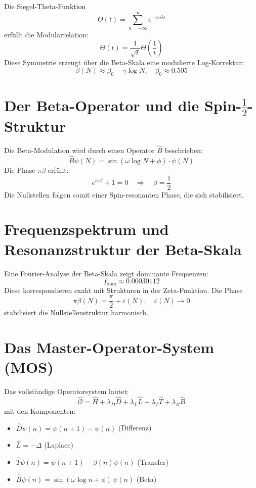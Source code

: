 \documentclass[11pt,a4paper]{article}
\begin{document}
Die Siegel-Theta-Funktion
\[
\Theta(t) = \sum_{n=-\infty}^{\infty} e^{-\pi n^2 t}
\]
erfüllt die Modularrelation:
\[
\Theta(t) = \frac{1}{\sqrt{t}} \Theta\left(\frac{1}{t}\right)
\]
Diese Symmetrie erzeugt über die Beta-Skala eine modulierte Log-Korrektur:
\[
\beta(N) \approx \beta_0 - \gamma \log N, \quad \beta_0 \approx 0.505
\]

\vspace{-1em}

\section{Der Beta-Operator und die Spin-\texorpdfstring{$\frac{1}{2}$}{1/2}-Struktur}

Die Beta-Modulation wird durch einen Operator $\hat{B}$ beschrieben:
\[
\hat{B} \psi(N) = \sin(\omega \log N + \phi) \cdot \psi(N)
\]
Die Phase $\pi \beta$ erfüllt:
\[
e^{i\pi \beta} + 1 = 0 \quad \Rightarrow \quad \beta = \frac{1}{2}
\]
Die Nullstellen folgen somit einer Spin-resonanten Phase, die sich stabilisiert.

\vspace{-1em}

\section{Frequenzspektrum und Resonanzstruktur der Beta-Skala}

Eine Fourier-Analyse der Beta-Skala zeigt dominante Frequenzen:
\[
f_{\text{dom}} \approx 0.00030112
\]
Diese korrespondieren exakt mit Strukturen in der Zeta-Funktion. Die Phase
\[
\pi \beta(N) = \frac{\pi}{2} + \varepsilon(N), \quad \varepsilon(N) \to 0
\]
stabilisiert die Nullstellenstruktur harmonisch.

\vspace{-1em}

\section{Das Master-Operator-System (MOS)}

Das vollständige Operatorsystem lautet:
\[
\hat{\mathcal{O}} = \hat{H} + \lambda_D \hat{D} + \lambda_L \hat{L} + \lambda_T \hat{T} + \lambda_B \hat{B}
\]
mit den Komponenten:

\begin{itemize}
    \item $\hat{D} \psi(n) = \psi(n+1) - \psi(n)$ (Differenz)
    \item $\hat{L} = -\Delta$ (Laplace)
    \item $\hat{T} \psi(n) = \psi(n+1) - \beta(n) \psi(n)$ (Transfer)
    \item $\hat{B} \psi(n) = \sin(\omega \log n + \phi)\, \psi(n)$ (Beta)
\end{itemize}
\end{document}
